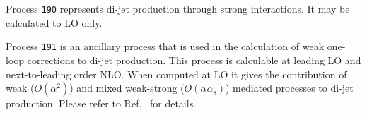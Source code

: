 \label{subsec:dijet}

Process {\tt 190} represents di-jet production through strong interactions.
It may be calculated to LO only.

Process {\tt 191} is an ancillary process that is used in the calculation of
weak one-loop corrections to di-jet production.  
This process is calculable at leading LO and next-to-leading order NLO.
When computed at LO it gives the
contribution of weak ($O(\alpha^2)$) and mixed weak-strong ($O(\alpha\alpha_s)$)
mediated processes to di-jet production.  Please refer to Ref.~\cite{Campbell:2016dks} for details.
